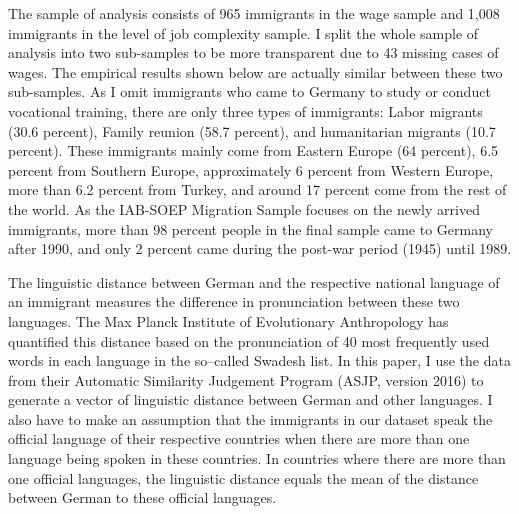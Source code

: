 \documentclass[12pt,a4paper]{article}
\begin{document}
The sample of analysis consists of 965 immigrants in the wage sample and 1,008 immigrants in the level of job complexity sample. I split the whole sample of analysis into two sub-samples to be more transparent due to 43 missing cases of wages. The empirical results shown below are actually similar between these two sub-samples. As I omit immigrants who came to Germany to study or conduct vocational training, there are only three types of immigrants: Labor migrants (30.6 percent), Family reunion (58.7 percent), and humanitarian migrants (10.7 percent). These immigrants mainly come from Eastern Europe (64 percent), 6.5 percent from Southern Europe, approximately 6 percent from Western Europe, more than 6.2 percent from Turkey, and around 17 percent come from the rest of the world. As the IAB-SOEP Migration Sample focuses on the newly arrived immigrants, more than 98 percent people in the final sample came to Germany after 1990, and only 2 percent came during the post-war period (1945) until 1989. 

The linguistic distance between German and the respective national language of an immigrant measures the difference in pronunciation between these two languages. The Max Planck Institute of Evolutionary Anthropology has quantified this distance based on the pronunciation of 40 most frequently used words in each language in the so--called Swadesh list. In this paper, I use the data from their Automatic Similarity Judgement Program (ASJP, version 2016) to generate a vector of linguistic distance between German and other languages. I also have to make an assumption that the immigrants in our dataset speak the official language of their respective countries when there are more than one language being spoken in these countries. In countries where there are more than one official languages, the linguistic distance equals the mean of the distance between German to these official languages.

\end{document}
